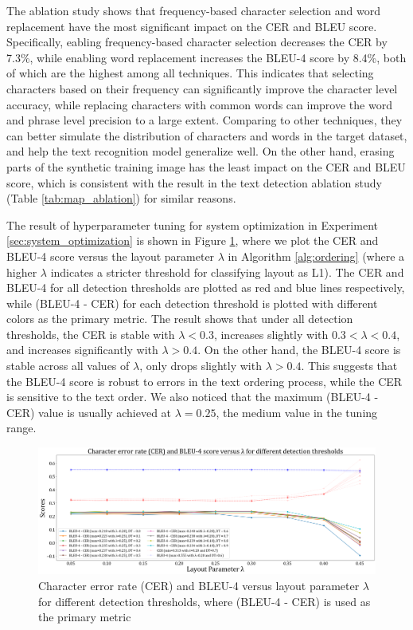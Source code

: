 \documentclass[12pt,twoside]{report}
\begin{document}
The ablation study shows that frequency-based character selection and word replacement have the most significant impact on the CER and BLEU score. Specifically, eabling frequency-based character selection decreases the CER by 7.3\%, while enabling word replacement increases the BLEU-4 score by 8.4\%, both of which are the highest among all techniques. This indicates that selecting characters based on their frequency can significantly improve the character level accuracy, while replacing characters with common words can improve the word and phrase level precision to a large extent. Comparing to other techniques, they can better simulate the distribution of characters and words in the target dataset, and help the text recognition model generalize well. On the other hand, erasing parts of the synthetic training image has the least impact on the CER and BLEU score, which is consistent with the result in the text detection ablation study (Table \ref{tab:map_ablation}) for similar reasons.

The result of hyperparameter tuning for system optimization in Experiment \ref{sec:system_optimization} is shown in Figure \ref{fig:cer_bleu}, where we plot the CER and BLEU-4 score versus the layout parameter $\lambda$ in Algorithm \ref{alg:ordering} (where a higher $\lambda$ indicates a stricter threshold for classifying layout as L1). The CER and BLEU-4 for all detection thresholds are plotted as red and blue lines respectively, while (BLEU-4 - CER) for each detection threshold is plotted with different colors as the primary metric. The result shows that under all detection thresholds, the CER is stable with $\lambda<0.3$, increases slightly with $0.3<\lambda<0.4$, and increases significantly with $\lambda>0.4$. On the other hand, the BLEU-4 score is stable across all values of $\lambda$, only drops slightly with $\lambda>0.4$. This suggests that the BLEU-4 score is robust to errors in the text ordering process, while the CER is sensitive to the text order. We also noticed that the maximum (BLEU-4 - CER) value is usually achieved at $\lambda=0.25$, the medium value in the tuning range.

\begin{figure}[htbp]
    \centering
    \includegraphics[width=\textwidth]{./figures/cer_bleu.png}
    \caption{Character error rate (CER) and BLEU-4 versus layout parameter $\lambda$ for different detection thresholds, where (BLEU-4 - CER) is used as the primary metric}
    \label{fig:cer_bleu}
\end{figure}
\end{document}
